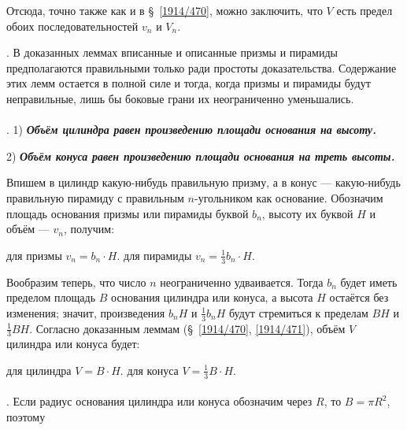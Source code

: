 Отсюда, точно также как и в §~\ref{1914/470}, можно заключить, что $V$ есть предел обоих последовательностей $v_n$ и $V_n$.

{\small
\medskip

. В доказанных леммах вписанные и описанные призмы и пирамиды предполагаются правильными только ради простоты доказательства. Содержание этих лемм остается в полной силе и тогда, когда призмы и пирамиды будут неправильные, лишь бы боковые грани их неограниченно уменьшались. 

}

\paragraph{}\label{1938/s120}
.
1) \textbf{\emph{Объём цилиндра равен произведению площади основания на высоту.}}

2) \textbf{\emph{Объём конуса равен произведению площади основания на треть высоты.}}

Впишем в цилиндр какую-нибудь правильную призму, а в конус — какую-нибудь правильную пирамиду с правильным $n$-угольником как основание.
Обозначим площадь основания призмы или пирамиды буквой $b_n$, высоту их буквой $H$ и объём — $v_n$, получим:

\medskip

\setlength{\columnseprule}{.2pt}
\begin{paracol}{2}
для призмы $v_n = b_n\cdot H.$
\switchcolumn
для пирамиды $v_n= \tfrac13 b_n\cdot H.$
\end{paracol}

\medskip

Вообразим теперь, что число $n$ неограниченно удваивается.
Тогда $b_n$ будет иметь пределом площадь $B$ основания цилиндра или конуса, а высота $H$ остаётся без изменения;
значит, произведения $b_nH$ и $\tfrac13b_nH$ будут стремиться к пределам $BH$ и $\tfrac13BH$.
Согласно доказанным леммам (§~\ref{1914/470}, \ref{1914/471}), объём $V$ цилиндра или конуса будет:

\medskip

\setlength{\columnseprule}{.2pt}
\begin{paracol}{2}
для цилиндра $V = B\cdot  H$.
\switchcolumn
для конуса $V= \tfrac13 B\cdot  H$.
\end{paracol}

\medskip

\paragraph{}\label{1938/s121}
.
Если радиус основания цилиндра или конуса обозначим через $R$, то $B= \pi R^2$, поэтому 

